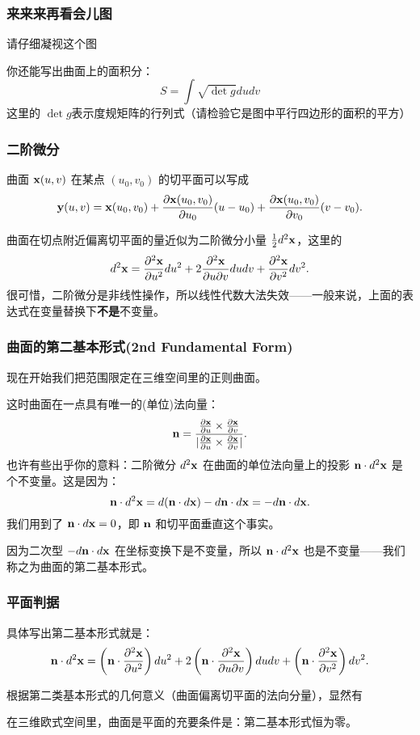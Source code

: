 \documentclass[CJK,13pt]{beamer}
\begin{document}
\begin{frame}
  \frametitle{来来来再看会儿图}
  请仔细凝视这个图
  
  
  你还能写出曲面上的面积分：
  $$ S = \int \sqrt{\det g} du dv $$
  这里的 $\det g$表示度规矩阵的行列式（请检验它是图中平行四边形的面积的平方）
\end{frame}



\begin{frame}
  \frametitle{二阶微分}
  曲面 ${\mathbf{x}}(u,v)$ 在某点 $(u_0, v_0)$ 的切平面可以写成
  $$ {\mathbf{y}}(u, v) = {\mathbf{x}}(u_0,v_0) + \frac{\partial {\mathbf{x}}(u_0,v_0)}{\partial u_0} (u-u_0)  + \frac{\partial {\mathbf{x}}(u_0,v_0)}{\partial v_0} (v-v_0).$$

  \skiplines
  
  曲面在切点附近偏离切平面的量近似为二阶微分小量 $\frac{1}{2}d^2{\mathbf{x}}$，这里的
  $$ d^2{\mathbf{x}} = \frac{\partial^2 {\mathbf{x}}}{\partial u^2} du^2 + 2\frac{\partial^2 {\mathbf{x}}}{\partial u\partial v} du dv + \frac{\partial^2 {\mathbf{x}}}{\partial v^2} dv^2.$$
  很可惜，二阶微分是非线性操作，所以线性代数大法失效——一般来说，上面的表达式在变量替换下{\bf 不是}不变量。
\end{frame}


\begin{frame}
  \frametitle{曲面的第二基本形式(2nd Fundamental Form)}
  现在开始我们把范围限定在三维空间里的正则曲面。

  这时曲面在一点具有唯一的(单位)法向量：
{\blue  $${\mathbf{n}} = \frac{\frac{\partial{\mathbf{x}}}{\partial u}\times \frac{\partial{\mathbf{x}}}{\partial v}}{\lvert\frac{\partial{\mathbf{x}}}{\partial u}\times \frac{\partial{\mathbf{x}}}{\partial v}\rvert}.$$  }
  也许有些出乎你的意料：二阶微分 $d^2{\mathbf{x}}$ 在曲面的单位法向量上的投影 ${\mathbf{n}}\cdot d^2{\mathbf{x}} $ 是个不变量。这是因为：
  $$  {\mathbf{n}} \cdot d^2{\mathbf{x}} = d( {\mathbf{n}} \cdot d{\mathbf{x}}) - d{\mathbf{n}} \cdot d{\mathbf{x}} = - d{\mathbf{n}} \cdot d{\mathbf{x}}.$$
  我们用到了 ${\mathbf{n}} \cdot d{\mathbf{x}} = 0$，即 ${\mathbf{n}}$ 和切平面垂直这个事实。
  
  因为二次型 $-d{\mathbf{n}}\cdot d{\mathbf{x}}$ 在坐标变换下是不变量，所以 ${\mathbf{n}}\cdot d^2{\mathbf{x}}$ 也是不变量——我们称之为曲面的第二基本形式。
\end{frame}

\begin{frame}
  \frametitle{平面判据}
  具体写出第二基本形式就是：
{\blue $${\mathbf{n}}\cdot d^2{\mathbf{x}} =\left({\mathbf{n}}\cdot \frac{\partial^2 {\mathbf{x}}}{\partial u^2}\right) du^2 + 2\left({\mathbf{n}}\cdot\frac{\partial^2 {\mathbf{x}}}{\partial u\partial v}\right) du dv + \left({\mathbf{n}}\cdot\frac{\partial^2 {\mathbf{x}}}{\partial v^2}\right) dv^2.$$}
  
  根据第二类基本形式的几何意义（曲面偏离切平面的法向分量），显然有
  
  {\blue 在三维欧式空间里，曲面是平面的充要条件是：第二基本形式恒为零。}
\end{frame}
\end{document}
